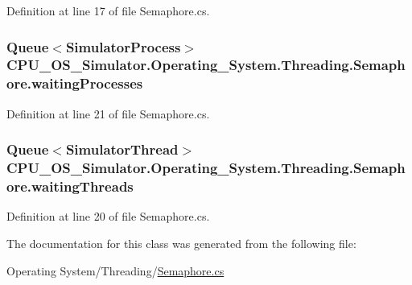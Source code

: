 Definition at line 17 of file Semaphore.\+cs.

\hypertarget{class_c_p_u___o_s___simulator_1_1_operating___system_1_1_threading_1_1_semaphore_a6adac6dc7832c6b8b1aef64971595b10}{}
\subsubsection[{waiting\+Processes}]{\setlength{\rightskip}{0pt plus 5cm}Queue$<${\bf Simulator\+Process}$>$ C\+P\+U\+\_\+\+O\+S\+\_\+\+Simulator.\+Operating\+\_\+\+System.\+Threading.\+Semaphore.\+waiting\+Processes\hspace{0.3cm}{\ttfamily [private]}}\label{class_c_p_u___o_s___simulator_1_1_operating___system_1_1_threading_1_1_semaphore_a6adac6dc7832c6b8b1aef64971595b10}


Definition at line 21 of file Semaphore.\+cs.

\hypertarget{class_c_p_u___o_s___simulator_1_1_operating___system_1_1_threading_1_1_semaphore_aedb8f404f0caf1c69f6f56153c39635a}{}
\subsubsection[{waiting\+Threads}]{\setlength{\rightskip}{0pt plus 5cm}Queue$<${\bf Simulator\+Thread}$>$ C\+P\+U\+\_\+\+O\+S\+\_\+\+Simulator.\+Operating\+\_\+\+System.\+Threading.\+Semaphore.\+waiting\+Threads\hspace{0.3cm}{\ttfamily [private]}}\label{class_c_p_u___o_s___simulator_1_1_operating___system_1_1_threading_1_1_semaphore_aedb8f404f0caf1c69f6f56153c39635a}


Definition at line 20 of file Semaphore.\+cs.



The documentation for this class was generated from the following file\+:\begin{DoxyCompactItemize}
\item 
Operating System/\+Threading/\hyperlink{_semaphore_8cs}{Semaphore.\+cs}\end{DoxyCompactItemize}
